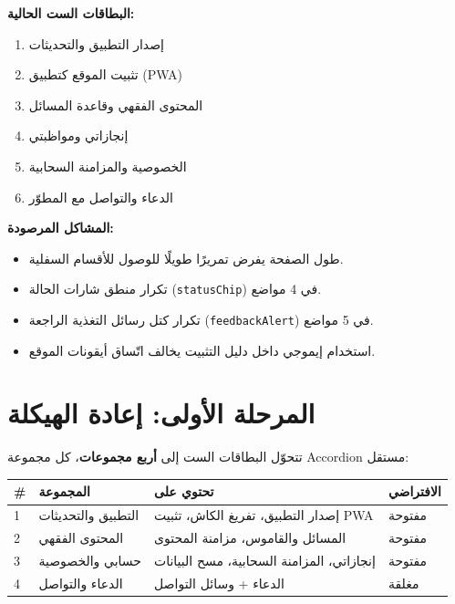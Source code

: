 \documentclass[11pt]{article}
\begin{document}
\vspace{6pt}
\textbf{البطاقات الست الحالية:}
\begin{enumerate}
  \item إصدار التطبيق والتحديثات
  \item تثبيت الموقع كتطبيق (PWA)
  \item المحتوى الفقهي وقاعدة المسائل
  \item إنجازاتي ومواظبتي
  \item الخصوصية والمزامنة السحابية
  \item الدعاء والتواصل مع المطوّر
\end{enumerate}

\textbf{المشاكل المرصودة:}
\begin{itemize}
  \item طول الصفحة يفرض تمريرًا طويلًا للوصول للأقسام السفلية.
  \item تكرار منطق شارات الحالة (\texttt{statusChip}) في 4 مواضع.
  \item تكرار كتل رسائل التغذية الراجعة (\texttt{feedbackAlert}) في 5 مواضع.
  \item استخدام إيموجي داخل دليل التثبيت يخالف اتّساق أيقونات الموقع.
\end{itemize}

\section{المرحلة الأولى: إعادة الهيكلة}

تتحوّل البطاقات الست إلى \textbf{أربع مجموعات}، كل مجموعة Accordion مستقل:

\vspace{6pt}
\renewcommand{\arraystretch}{1.4}
\begin{longtable}{@{}p{} p{} p{} p{}@{}}
\toprule
\textbf{\#} & \textbf{المجموعة} & \textbf{تحتوي على} & \textbf{الافتراضي} \\
\midrule
\endhead
1 & التطبيق والتحديثات & إصدار التطبيق، تفريغ الكاش، تثبيت PWA & مفتوحة \\
2 & المحتوى الفقهي & المسائل والقاموس، مزامنة المحتوى & مفتوحة \\
3 & حسابي والخصوصية & إنجازاتي، المزامنة السحابية، مسح البيانات & مفتوحة \\
4 & الدعاء والتواصل & الدعاء + وسائل التواصل & مغلقة \\
\bottomrule
\end{longtable}
\renewcommand{\arraystretch}{1.0}
\end{document}
